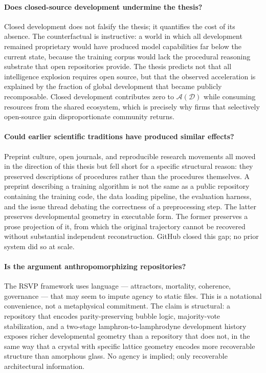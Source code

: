 \documentclass[11pt]{article}
\begin{document}
\paragraph{Does closed-source development undermine the thesis?}
Closed development does not falsify the thesis; it quantifies the cost of its
absence. The counterfactual is instructive: a world in which all development
remained proprietary would have produced model capabilities far below the
current state, because the training corpus would lack the procedural reasoning
substrate that open repositories provide. The thesis predicts not that all
intelligence explosion requires open source, but that the observed acceleration
is explained by the fraction of global development that became publicly
recomposable. Closed development contributes zero to $\mathcal{A}(\mathcal{D})$
while consuming resources from the shared ecosystem, which is precisely why
firms that selectively open-source gain disproportionate community returns.

\paragraph{Could earlier scientific traditions have produced similar effects?}
Preprint culture, open journals, and reproducible research movements all moved
in the direction of this thesis but fell short for a specific structural reason:
they preserved descriptions of procedures rather than the procedures themselves.
A preprint describing a training algorithm is not the same as a public
repository containing the training code, the data loading pipeline, the
evaluation harness, and the issue thread debating the correctness of a
preprocessing step. The latter preserves developmental geometry in executable
form. The former preserves a prose projection of it, from which the original
trajectory cannot be recovered without substantial independent reconstruction.
GitHub closed this gap; no prior system did so at scale.

\paragraph{Is the argument anthropomorphizing repositories?}
The RSVP framework uses language --- attractors, mortality, coherence,
governance --- that may seem to impute agency to static files. This is a
notational convenience, not a metaphysical commitment. The claim is structural:
a repository that encodes parity-preserving bubble logic, majority-vote
stabilization, and a two-stage lamphron-to-lamphrodyne development history
exposes richer developmental geometry than a repository that does not, in
the same way that a crystal with specific lattice geometry encodes more
recoverable structure than amorphous glass. No agency is implied; only
recoverable architectural information.
\end{document}
